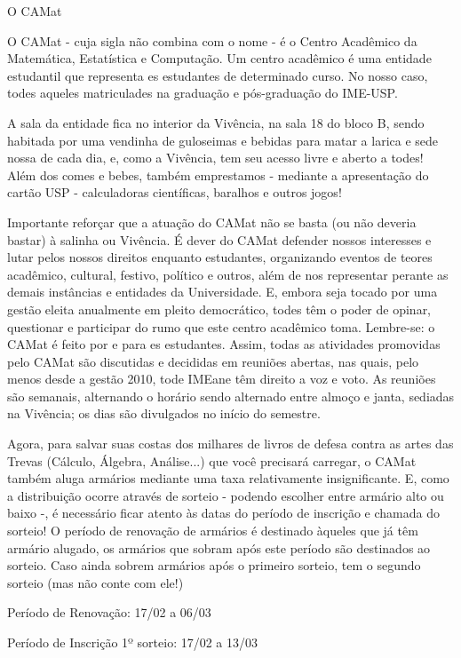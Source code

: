 \begin{secao}{O CAMat}

O CAMat - cuja sigla não combina com o nome - é o Centro Acadêmico da Matemática, Estatística e Computação.  Um centro acadêmico é uma entidade estudantil que representa es estudantes de determinado curso. No nosso caso, todes aqueles matriculades na graduação e pós-graduação do IME-USP.

A sala da entidade fica no interior da Vivência, na sala 18 do bloco B, sendo habitada por uma vendinha de guloseimas e bebidas para matar a larica e sede nossa de cada dia, e, como a Vivência, tem seu acesso livre e aberto a todes! Além dos comes e bebes, também emprestamos - mediante a apresentação do cartão USP - calculadoras científicas, baralhos e outros jogos!

Importante reforçar que a atuação do CAMat não se basta (ou não deveria bastar) à salinha ou Vivência. É dever do CAMat defender nossos interesses e lutar pelos nossos direitos enquanto estudantes, organizando eventos de teores acadêmico, cultural, festivo, político e outros, além de nos representar perante as demais instâncias e entidades da Universidade. E, embora seja tocado por uma gestão eleita anualmente em pleito democrático, todes têm o poder de opinar, questionar e participar do rumo que este centro acadêmico toma. Lembre-se: o CAMat é feito por e para es estudantes. Assim, todas as atividades promovidas pelo CAMat são discutidas e decididas em reuniões abertas, nas quais, pelo menos desde a gestão 2010, tode IMEane têm direito a voz e voto. As reuniões são semanais, alternando o horário sendo alternado entre almoço e janta, sediadas na Vivência; os dias são divulgados no início do semestre.

Agora, para salvar suas costas dos milhares de livros de defesa contra as artes das Trevas (Cálculo, Álgebra, Análise...) que você precisará carregar, o CAMat também aluga armários mediante uma taxa relativamente insignificante. E, como a distribuição ocorre através de sorteio - podendo escolher entre armário alto ou baixo -, é necessário ficar atento às datas do período de inscrição e chamada do sorteio! O período de renovação de armários é destinado àqueles que já têm armário alugado, os armários que sobram após este período são destinados ao sorteio. Caso ainda sobrem armários após o primeiro sorteio, tem o segundo sorteio (mas não conte com ele!)

Período de Renovação: 17/02 a 06/03

Período de Inscrição 1º sorteio: 17/02 a 13/03


\end{secao}
